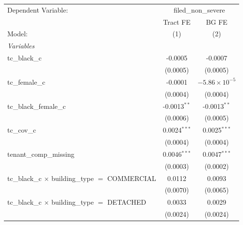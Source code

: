 \begin{tabular}{lcc}
   \tabularnewline \midrule \midrule
   Dependent Variable: & \multicolumn{2}{c}{filed\_non\_severe}\\
                                                                       & Tract FE               & BG FE \\   
   Model:                                                              & (1)                    & (2)\\  
   \midrule
   \emph{Variables}\\
   tc\_black\_c                                                        & -0.0005                & -0.0007\\   
                                                                       & (0.0005)               & (0.0005)\\   
   tc\_female\_c                                                       & -0.0001                & $-5.86\times 10^{-5}$\\    
                                                                       & (0.0004)               & (0.0004)\\   
   tc\_black\_female\_c                                                & -0.0013$^{**}$         & -0.0013$^{**}$\\   
                                                                       & (0.0006)               & (0.0005)\\   
   tc\_cov\_c                                                          & 0.0024$^{***}$         & 0.0025$^{***}$\\   
                                                                       & (0.0004)               & (0.0004)\\   
   tenant\_comp\_missing                                               & 0.0046$^{***}$         & 0.0047$^{***}$\\   
                                                                       & (0.0003)               & (0.0002)\\   
   tc\_black\_c $\times$ building\_type $=$ COMMERCIAL                 & 0.0112                 & 0.0093\\   
                                                                       & (0.0070)               & (0.0065)\\   
   tc\_black\_c $\times$ building\_type $=$ DETACHED                   & 0.0033                 & 0.0029\\   
                                                                       & (0.0024)               & (0.0024)\\   

\end{tabular}
